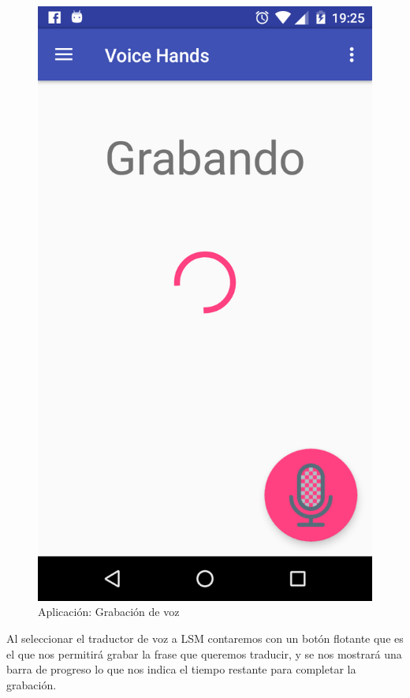 \begin{figure}[H]
	\centering
	\includegraphics[scale = 0.2]{figures/app04}
	\caption{Aplicación: Grabación de voz}
	\label{fig:app04}
\end{figure}

Al seleccionar el traductor de voz a LSM contaremos con un botón flotante que es el que nos permitirá grabar la frase que queremos traducir, y se nos mostrará una barra de progreso lo que nos indica el tiempo restante para completar la grabación.

